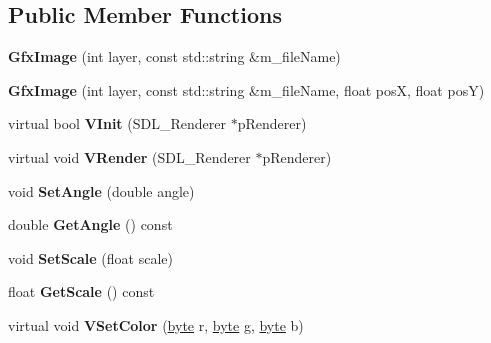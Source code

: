 \subsection*{Public Member Functions}
\begin{DoxyCompactItemize}
\item 
\hypertarget{classGfxImage_a5c7a658a17d8243fc72cdb7ccf978e88}{{\bfseries Gfx\-Image} (int layer, const std\-::string \&m\-\_\-file\-Name)}\label{classGfxImage_a5c7a658a17d8243fc72cdb7ccf978e88}

\item 
\hypertarget{classGfxImage_a22b56b6928fe10973930d3261bb3e80e}{{\bfseries Gfx\-Image} (int layer, const std\-::string \&m\-\_\-file\-Name, float pos\-X, float pos\-Y)}\label{classGfxImage_a22b56b6928fe10973930d3261bb3e80e}

\item 
\hypertarget{classGfxImage_a5ef1227e066ad472dea3953b86e84a65}{virtual bool {\bfseries V\-Init} (S\-D\-L\-\_\-\-Renderer $\ast$p\-Renderer)}\label{classGfxImage_a5ef1227e066ad472dea3953b86e84a65}

\item 
\hypertarget{classGfxImage_ac4bf4820c6a06742d1902147c135c258}{virtual void {\bfseries V\-Render} (S\-D\-L\-\_\-\-Renderer $\ast$p\-Renderer)}\label{classGfxImage_ac4bf4820c6a06742d1902147c135c258}

\item 
\hypertarget{classGfxImage_a41186f669f5f8ba7fcf65d32d8086003}{void {\bfseries Set\-Angle} (double angle)}\label{classGfxImage_a41186f669f5f8ba7fcf65d32d8086003}

\item 
\hypertarget{classGfxImage_aa78f8c12355ea7212804770320868f79}{double {\bfseries Get\-Angle} () const }\label{classGfxImage_aa78f8c12355ea7212804770320868f79}

\item 
\hypertarget{classGfxImage_ac7836cfe9867c29114dac16fc58ef22d}{void {\bfseries Set\-Scale} (float scale)}\label{classGfxImage_ac7836cfe9867c29114dac16fc58ef22d}

\item 
\hypertarget{classGfxImage_a9780c81b8a415042e01844e8bbd58df9}{float {\bfseries Get\-Scale} () const }\label{classGfxImage_a9780c81b8a415042e01844e8bbd58df9}

\item 
\hypertarget{classGfxImage_a62d118fb2b87be486bf26060079e4be5}{virtual void {\bfseries V\-Set\-Color} (\hyperlink{GameStd_8h_a0c8186d9b9b7880309c27230bbb5e69d}{byte} r, \hyperlink{GameStd_8h_a0c8186d9b9b7880309c27230bbb5e69d}{byte} g, \hyperlink{GameStd_8h_a0c8186d9b9b7880309c27230bbb5e69d}{byte} b)}\label{classGfxImage_a62d118fb2b87be486bf26060079e4be5}


\end{DoxyCompactItemize}

